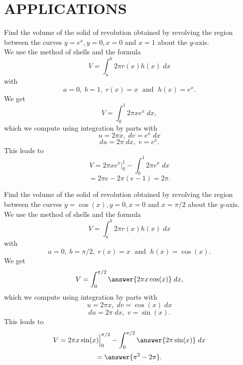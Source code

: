 \documentclass{ximera}
\begin{document}

\section{APPLICATIONS}

\begin{example}
Find the volume of the solid of revolution obtained by revolving the region between the curves $y = e^x, y = 0, x = 0$
and $x = 1$ about the $y$-axis.\\


We use the method of shells and the formula
\[
V = \int_a^b 2\pi r(x)h(x) \; dx
\]
with
\[
a = 0,\; b = 1, \; r(x) = x \; \text{ and } \; h(x) = e^x.
\]
We get
\[
V = \int_0^1 2\pi xe^x \; dx,
\]
which we compute using integration by parts with
\[
u = 2\pi x, \; dv = e^x \; dx
\]
\[
du = 2\pi \;dx, \; v = e^x.
\]
This leads to 
\[
V = 2\pi xe^x \Big|_0^1 - \int_0^1 2\pi e^x \; dx
\] 
\[
= 2\pi e - 2\pi (e-1) = 2\pi.
\]
\end{example} 

\begin{problem}
Find the volume of the solid of revolution obtained by revolving the region between the curves $y = \cos(x), y = 0, x = 0$
and $x = \pi/2$ about the $y$-axis.\\


We use the method of shells and the formula
\[
V = \int_a^b 2\pi r(x)h(x) \; dx
\]
with
\[
a = 0,\; b = \pi/2, \; r(x) = x \; \text{ and } \; h(x) = \cos(x).
\]
We get
\[
V = \int_0^{\pi/2} \answer{2\pi x \cos(x)} \; dx,
\]
which we compute using integration by parts with
\[
u = 2\pi x, \; dv = \cos(x) \; dx
\]
\[
du = 2\pi \;dx, \; v = \sin(x).
\]
This leads to 
\[
V = 2\pi x\sin(x) \Big|_0^{\pi/2} - \int_0^{\pi/2} \answer{2\pi \sin(x)} \; dx
\] 
\[
= \answer{\pi^2 - 2\pi}.
\]
\end{problem} 





\begin{center}
\begin{foldable}
\end{foldable}
\end{center}
\end{document}
